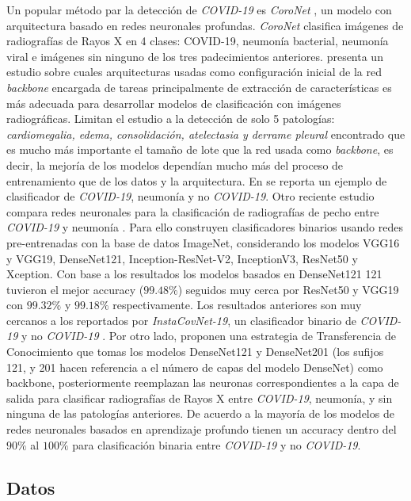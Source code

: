 Un popular método par la detección de \textit{COVID-19} es \textit{CoroNet} \cite{wang2020covid}, un
modelo con arquitectura basado en redes neuronales profundas. \textit{CoroNet} clasifica imágenes de
radiografías de Rayos X en 4 clases: COVID-19, neumonía bacterial, neumonía viral e imágenes sin
ninguno de los tres padecimientos anteriores. \citeauthor{bressem2020comparing} presenta un estudio
sobre cuales arquitecturas usadas como configuración inicial de la red \textit{backbone} encargada
de tareas principalmente de extracción de características es más adecuada para desarrollar modelos
de clasificación con imágenes radiográficas. Limitan el estudio a la detección de solo 5 patologías:
\textit{cardiomegalia, edema, consolidación, atelectasia y derrame pleural} encontrado que es mucho más
importante el tamaño de lote que la red usada como \textit{backbone}, es decir, la mejoría de los
modelos dependían mucho más del proceso de entrenamiento que de los datos y la arquitectura.
En \cite{zhong2021deep} se reporta un ejemplo de clasificador de \textit{COVID-19}, neumonía y
no \textit{COVID-19}. Otro reciente estudio compara redes neuronales para la clasificación de
radiografías de pecho entre \textit{COVID-19} y neumonía \cite{shazia2021comparative}. Para ello
construyen clasificadores binarios usando redes pre-entrenadas con la base de datos ImageNet,
considerando los modelos VGG16 y VGG19, DenseNet121, Inception-ResNet-V2, InceptionV3, ResNet50 y
Xception. Con base a los resultados los modelos basados en DenseNet121 121 tuvieron el mejor
accuracy ($99.48\%$) seguidos muy cerca por ResNet50 y VGG19 con $99.32\%$ y $99.18\%$
respectivamente. Los resultados anteriores son muy cercanos a los reportados por
\textit{InstaCovNet-19}, un clasificador binario de \textit{COVID-19} y no \textit{COVID-19}
\cite{gupta2021instacovnet}. Por otro lado, \citeauthor{bassi2021deep} proponen una estrategia de
Transferencia de Conocimiento que tomas los modelos DenseNet121 y DenseNet201 (los sufijos 121, y 201
hacen referencia a el número de capas del modelo DenseNet) como backbone, posteriormente reemplazan
las neuronas correspondientes a la capa de salida para clasificar radiografías de Rayos X entre
\textit{COVID-19}, neumonía, y sin ninguna de las patologías anteriores. De acuerdo a
\citeauthor{shoeibi2020automated} la mayoría de los modelos de redes neuronales basados en aprendizaje
profundo tienen un accuracy dentro del $90\%$ al $100\%$ para clasificación binaria entre
\textit{COVID-19} y no \textit{COVID-19}.


\subsection{Datos}

